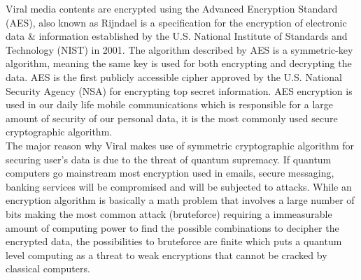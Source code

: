 \documentclass[10pt]{article}
\begin{document}
Viral media contents are encrypted using the Advanced Encryption Standard (AES), also known as Rijndael is a specification for the encryption of electronic data \& information established by the U.S. National Institute of Standards and Technology (NIST) in 2001. The algorithm described by AES is a symmetric-key algorithm, meaning the same key is used for both encrypting and decrypting the data. AES is the first publicly accessible cipher approved by the U.S. National Security Agency (NSA) for encrypting top secret information. AES encryption is used in our daily life mobile communications which is responsible for a large amount of security of our personal data, it is the most commonly used secure cryptographic algorithm.\\

The major reason why Viral makes use of symmetric cryptographic algorithm for securing user's data is due to the threat of quantum supremacy. If quantum computers go mainstream most encryption used in emails, secure messaging, banking services will be compromised and will be subjected to attacks. While an encryption algorithm is basically a math problem that involves a large number of bits making the most common attack (bruteforce) requiring a immeasurable amount of computing power to find the possible combinations to decipher the encrypted data, the possibilities to bruteforce are finite which puts a quantum level computing as a threat to weak encryptions that cannot be cracked by classical computers.\\
\end{document}
